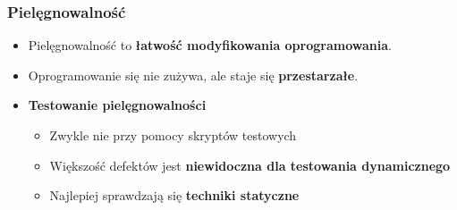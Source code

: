 \documentclass[../main.tex]{subfiles}
\begin{document}
    \subsubsection{Pielęgnowalność}
    \begin{itemize}
        \item Pielęgnowalność to \textbf{łatwość modyfikowania oprogramowania}.
        \item Oprogramowanie się nie zużywa, ale staje się \textbf{przestarzałe}.
        \item \textbf{Testowanie pielęgnowalności}
        \begin{itemize}
            \item Zwykle nie przy pomocy skryptów testowych
            \item Większość defektów jest \textbf{niewidoczna dla testowania dynamicznego}
            \item Najlepiej sprawdzają się \textbf{techniki statyczne}
        \end{itemize}
    \end{itemize}
\end{document}

